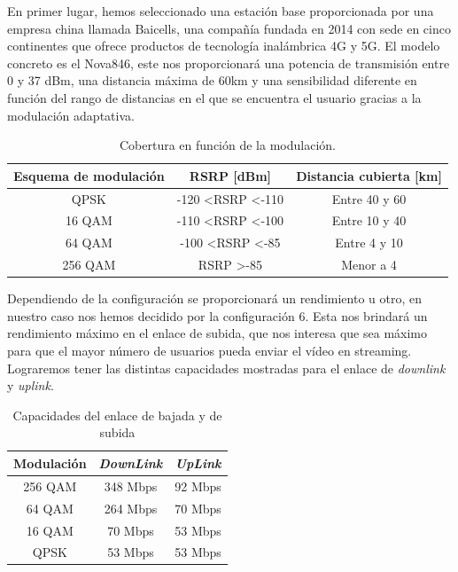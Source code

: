 En primer lugar, hemos seleccionado una estación base proporcionada por una empresa china llamada Baicells, una compañía fundada en 2014 con sede en cinco continentes que ofrece productos de tecnología inalámbrica 4G y 5G. El modelo concreto es el Nova846, este nos proporcionará una potencia de transmisión entre 0 y 37 dBm, una distancia máxima de 60km y una sensibilidad diferente en función del rango de distancias en el que se encuentra el usuario gracias a la modulación adaptativa.\\

\begin{table}[H]
\centering
\begin{tabular}{|c|c|c|}
\hline
\textbf{Esquema de modulación} & \textbf{RSRP {[}dBm{]}}            & \textbf{Distancia cubierta {[}km{]}} \\ \hline \hline
QPSK                           & -120 \textless RSRP \textless -110 & Entre 40 y 60                        \\ \hline
16 QAM                         & -110 \textless RSRP \textless -100 & Entre 10 y 40                        \\ \hline
64 QAM                         & -100 \textless RSRP \textless -85  & Entre 4 y 10                         \\ \hline
256 QAM                        & RSRP \textgreater -85              & Menor a 4                            \\ \hline
\end{tabular}
\caption{Cobertura en función de la modulación.}
\label{cobertura}
\end{table}

Dependiendo de la configuración se proporcionará un rendimiento u otro, en nuestro caso nos hemos decidido por la configuración 6. Esta nos brindará un rendimiento máximo en el enlace de subida, que nos interesa que sea máximo para que el mayor número de usuarios pueda enviar el vídeo en streaming. Lograremos tener las distintas capacidades mostradas para el enlace de \textit{downlink} y \textit{uplink}.\\

\begin{table}[H]
\centering
\begin{tabular}{|c||c|c|}
\hline
\textbf{Modulación} & \textit{\textbf{DownLink}} & \textit{\textbf{UpLink}} \\ \hline \hline
256 QAM             & 348 Mbps                   & 92 Mbps                  \\ \hline
64 QAM              & 264 Mbps                   & 70 Mbps                  \\ \hline
16 QAM              & 70 Mbps                    & 53 Mbps                  \\ \hline
QPSK                & 53 Mbps                    & 53 Mbps                  \\ \hline
\end{tabular}
\caption{Capacidades del enlace de bajada y de subida}
\label{capacidad}
\end{table}

